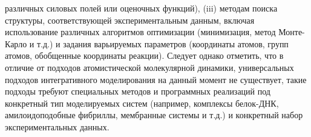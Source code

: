 различных силовых полей или оценочных функций), (iii) методам поиска структуры, соответствующей экспериментальным данным, включая использование различных алгоритмов оптимизации (минимизация, метод Монте-Карло и т.д.) и задания варьируемых параметров (координаты атомов, групп атомов, обобщенные координаты реакции). Следует однако отметить, что в отличие от подходов атомистической молекулярной динамики, универсальных подходов интегративного моделирования на данный момент не существует, такие подходы требуют специальных методов и программных реализаций под конкретный тип моделируемых систем (например, комплексы белок-ДНК, амилоидоподобные фибриллы, мембранные системы и т.д.) и конкретный набор экспериментальных данных.  





